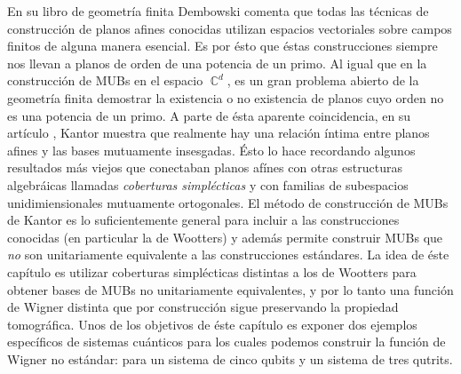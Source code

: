\documentclass[a4paper,11pt]{report}
\DeclareMathOperator{\C}{\mathbb{C}}
\begin{document}
  En su libro de geometría finita \cite{dembowski1968}
  Dembowski comenta que todas las técnicas de construcción
  de planos afines conocidas utilizan espacios vectoriales
  sobre campos finitos de alguna manera esencial. Es por
  ésto que éstas construcciones siempre nos llevan a planos
  de orden de una potencia de un primo. Al igual que en la
  construcción de MUBs en el espacio $\C^{d}$, es un gran
  problema abierto de la geometría finita demostrar la
  existencia o no existencia de planos cuyo orden no es una
  potencia de un primo. A parte de ésta aparente
  coincidencia, en su artículo \cite{kantor2012}, Kantor
  muestra que realmente hay una relación íntima entre planos
  afines y las bases mutuamente insesgadas.  Ésto lo hace
  recordando algunos resultados más viejos que conectaban
  planos afínes con otras estructuras algebráicas llamadas
  \textit{coberturas simplécticas} y con familias de
  subespacios unidimiensionales mutuamente ortogonales.  El
  método de construcción de MUBs de Kantor es lo
  suficientemente general para incluir a las construcciones
  conocidas (en particular la de Wootters) y además permite
  construir MUBs que \textit{no} son unitariamente
  equivalente a las construcciones estándares. La idea de
  éste capítulo es utilizar coberturas simplécticas
  distintas a los de Wootters para obtener bases de MUBs no
  unitariamente equivalentes, y por lo tanto una función de
  Wigner distinta que por construcción sigue preservando la
  propiedad tomográfica.  Unos de los objetivos de éste
  capítulo es exponer dos ejemplos específicos de sistemas
  cuánticos para los cuales podemos construir la función de
  Wigner no estándar: para un sistema de cinco qubits y un
  sistema de tres qutrits.
\end{document}
